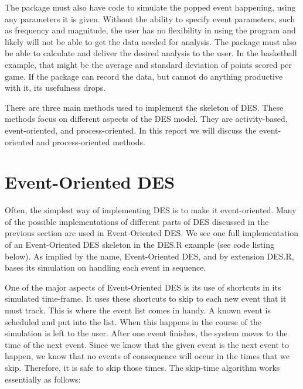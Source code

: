\documentclass[a4paper, 11pt]{article} %
\begin{document}
The package must also have code to simulate the popped event happening, using any parameters it is given. Without the ability to specify event parameters, such as frequency and magnitude, the user has no flexibility in using the program and likely will not be able to get the data needed for analysis. The package must also be able to calculate and deliver the desired analysis to the user. In the basketball example, that might be the average and standard deviation of points scored per game. If the package can record the data, but cannot do anything productive with it, its usefulness drops.

There are three main methods used to implement the skeleton of DES. These methods focus on different aspects of the DES model. They are activity-based, event-oriented, and process-oriented. In this report we will discuss the event-oriented and process-oriented methods.


\section{Event-Oriented DES}


Often, the simplest way of implementing DES is to make it event-oriented. Many of the possible implementations of different parts of DES discussed in the previous section are used in Event-Oriented DES. We see one full implementation of an Event-Oriented DES skeleton in the DES.R example (see code listing below). As implied by the name, Event-Oriented DES, and by extension DES.R, bases its simulation on handling each event in sequence. 

One of the major aspects of Event-Oriented DES is its use of shortcuts in its simulated time-frame. It uses these shortcuts to skip to each new event that it must track. This is where the event list comes in handy. A known event is scheduled and put into the list. When this happens in the course of the simulation is left to the user. After one event finishes, the system moves to the time of the next event. Since we know that the given event is the next event to happen, we know that no events of consequence will occur in the times that we skip. Therefore, it is safe to skip those times. The skip-time algorithm works essentially as follows: \newline
\end{document}
